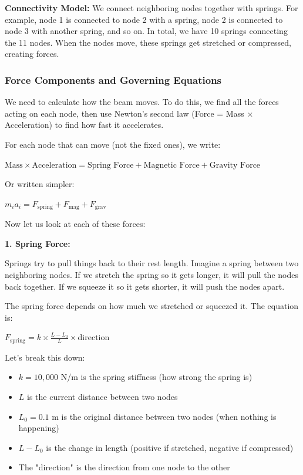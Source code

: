 \documentclass[11pt]{article}
\begin{document}
\textbf{Connectivity Model:}
We connect neighboring nodes together with springs. For example, node 1 is connected to node 2 with a spring, node 2 is connected to node 3 with another spring, and so on. In total, we have 10 springs connecting the 11 nodes. When the nodes move, these springs get stretched or compressed, creating forces.
\subsubsection{Force Components and Governing Equations}
\label{sec:orgd53d764}

We need to calculate how the beam moves. To do this, we find all the forces acting on each node, then use Newton's second law (Force = Mass × Acceleration) to find how fast it accelerates.

For each node that can move (not the fixed ones), we write:

\(\text{Mass} \times \text{Acceleration} = \text{Spring Force} + \text{Magnetic Force} + \text{Gravity Force}\)

Or written simpler:

\(m_i a_i = F_{\text{spring}} + F_{\text{mag}} + F_{\text{grav}}\)

Now let us look at each of these forces:

\textbf{1. Spring Force:}

Springs try to pull things back to their rest length. Imagine a spring between two neighboring nodes. If we stretch the spring so it gets longer, it will pull the nodes back together. If we squeeze it so it gets shorter, it will push the nodes apart.

The spring force depends on how much we stretched or squeezed it. The equation is:

\(F_{\text{spring}} = k \times \frac{L - L_0}{L} \times \text{direction}\)

Let's break this down:
\begin{itemize}
\item \(k = 10,000\) N/m is the spring stiffness (how strong the spring is)
\item \(L\) is the current distance between two nodes
\item \(L_0 = 0.1\) m is the original distance between two nodes (when nothing is happening)
\item \(L - L_0\) is the change in length (positive if stretched, negative if compressed)
\item The "direction" is the direction from one node to the other
\end{itemize}
\end{document}
